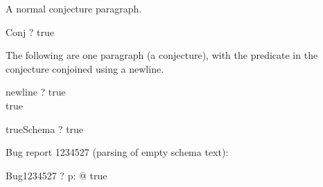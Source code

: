 A normal conjecture paragraph. 
\begin{theorem}{Conj}
  \vdash? true
\end{theorem}

The following are one paragraph (a conjecture), with the predicate in
the conjecture conjoined using a newline.

\begin{theorem}{newline}
  \vdash? true \\ true
\end{theorem}

\begin{theorem}{trueSchema}
  \vdash? true \\ [X, Y : \nat]
\end{theorem}

Bug report 1234527 (parsing of empty schema text):

\begin{theorem}{Bug1234527}
  \vdash? \forall p: \power [ ] @ true
\end{theorem}
